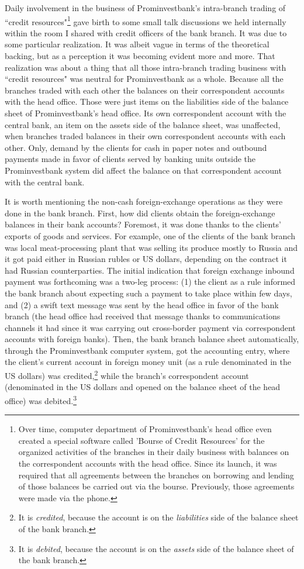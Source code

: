 Daily involvement in the business of Prominvestbank's intra-branch trading of ``credit resources"\footnote{Over time, computer department of Prominvestbank's head office even created a special software called 'Bourse of Credit Resources' for the organized activities of the branches in their daily business with balances on the correspondent accounts with the head office. Since its launch, it was required that all agreements between the branches on borrowing and lending of those balances be carried out via the bourse. Previously, those agreements were made via the phone.} gave birth to some small talk discussions we held internally within the room I shared with credit officers of the bank branch. It was due to some particular realization. It was albeit vague in terms of the theoretical backing, but as a perception it was becoming evident more and more. That realization was about a thing that all those intra-branch trading business with ``credit resources" was neutral for Prominvestbank as a whole. Because all the branches traded with each other the balances on their correspondent accounts with the head office. Those were just items on the liabilities side of the balance sheet of Prominvestbank's head office. Its own correspondent account with the central bank, an item on the assets side of the balance sheet, was unaffected, when branches traded balances in their own correspondent accounts with each other. Only, demand by the clients for cash in paper notes and outbound payments made in favor of clients served by banking units outside the Prominvestbank system did affect the balance on that correspondent account with the central bank.

It is worth mentioning the non-cash foreign-exchange operations as they were done in the bank branch. First, how did clients obtain the foreign-exchange balances in their bank accounts? Foremost, it was done thanks to the clients' exports of goods and services. For example, one of the clients of the bank branch was local meat-processing plant that was selling its produce mostly to Russia and it got paid either in Russian rubles or US dollars, depending on the contract it had Russian counterparties. The initial indication that foreign exchange inbound payment was forthcoming was a two-leg process: (1) the client as a rule informed the bank branch about expecting such a payment to take place within few days, and (2) a \ac{swift} text message was sent by the head office in favor of the bank branch (the head office had received that message thanks to communications  channels it had since it was carrying out cross-border payment via correspondent accounts with foreign banks). Then, the bank branch balance sheet automatically, through the Prominvestbank computer system, got the accounting entry, where the client's current account in foreign money unit (as a rule denominated in the US dollars) was credited,\footnote{It is \textit{credited}, because the account is on the \textit{liabilities} side of the balance sheet of the bank branch.} while the branch's correspondent account (denominated in the US dollars and opened on the balance sheet of the head office) was debited.\footnote{It is \textit{debited}, because the account is on the \textit{assets} side of the balance sheet of the bank branch.}

